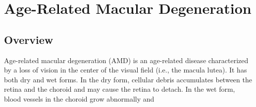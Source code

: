 
\section{Age-Related Macular Degeneration}

\subsection{Overview}

Age-related macular degeneration (AMD) is an age-related disease characterized by a loss of vision in the center of the visual field (i.e., the macula lutea). It has both dry and wet forms. In the dry form, cellular debris accumulates between the retina and the choroid and may cause the retina to detach. In the wet form, blood vessels in the choroid grow abnormally and